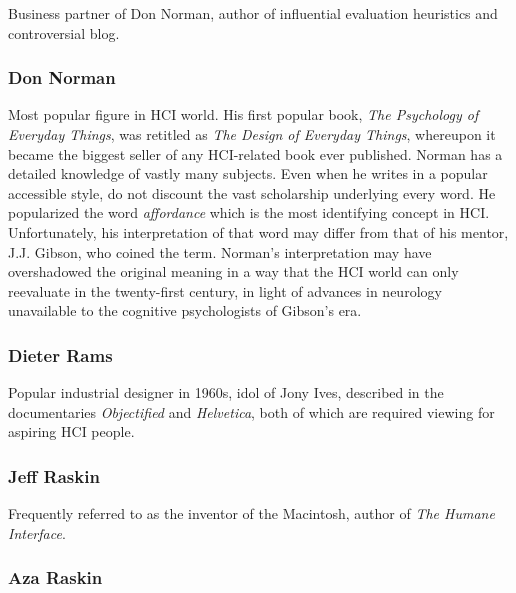 Business partner of Don Norman, author of influential evaluation
heuristics and controversial blog.

\hypertarget{don-norman}{%
\subsubsection{Don Norman}\label{don-norman}}

Most popular figure in HCI world. His first popular book, \emph{The
Psychology of Everyday Things}, was retitled as \emph{The Design of
Everyday Things}, whereupon it became the biggest seller of any
HCI-related book ever published. Norman has a detailed knowledge of
vastly many subjects. Even when he writes in a popular accessible style,
do not discount the vast scholarship underlying every word. He
popularized the word \emph{affordance} which is the most identifying
concept in HCI. Unfortunately, his interpretation of that word may
differ from that of his mentor, J.J. Gibson, who coined the term.
Norman's interpretation may have overshadowed the original meaning in a
way that the HCI world can only reevaluate in the twenty-first century,
in light of advances in neurology unavailable to the cognitive
psychologists of Gibson's era.

\hypertarget{dieter-rams}{%
\subsubsection{Dieter Rams}\label{dieter-rams}}

Popular industrial designer in 1960s, idol of Jony Ives, described in
the documentaries \emph{Objectified} and \emph{Helvetica}, both of which
are required viewing for aspiring HCI people.

\hypertarget{jeff-raskin}{%
\subsubsection{Jeff Raskin}\label{jeff-raskin}}

Frequently referred to as the inventor of the Macintosh, author of
\emph{The Humane Interface}.

\hypertarget{aza-raskin}{%
\subsubsection{Aza Raskin}\label{aza-raskin}}

